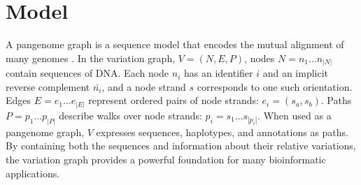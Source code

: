 \documentclass{bioinfo}
\begin{document}



\section{Model}

A pangenome graph is a sequence model that encodes the mutual alignment of many genomes \citep{Garrison_2019_thesis,Eizenga_2020}.
In the variation graph, $V = (N, E, P)$, nodes $N = n_1\ldots n_{|N|}$ contain sequences of DNA.
Each node $n_i$ has an identifier $i$ and an implicit reverse complement $\bar{n_i}$, and a node strand $s$ corresponds to one such orientation.
Edges $E = e_1\ldots e_{|E|}$ represent ordered pairs of node strands: $e_i = ( s_a, s_b )$.
Paths $P = p_1\ldots p_{|P|}$ describe walks over node strands: $p_i = s_1 \ldots s_{|p_i|}$.
When used as a pangenome graph, $V$ expresses sequences, haplotypes, and annotations as paths.
By containing both the sequences and information about their relative variations, the variation graph provides a powerful foundation for many bioinformatic applications.
\end{document}
